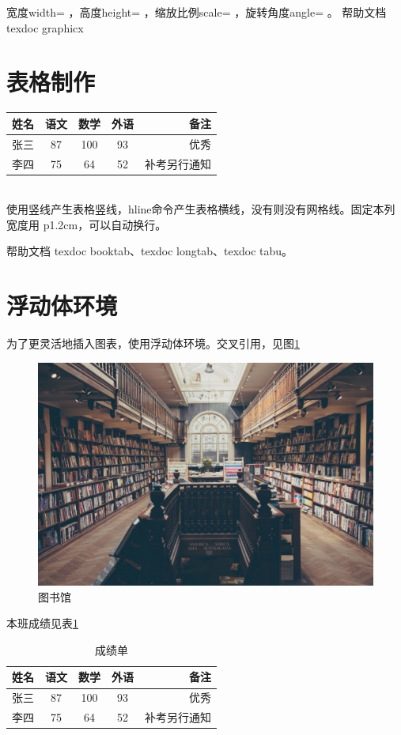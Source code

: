 \documentclass[UTF8]{article}  %
\begin{document}
宽度width= ，高度height= ，缩放比例scale= ，旋转角度angle= 。
帮助文档texdoc graphicx
\section{表格制作}
\begin{tabular}{|l||c|c|c|r|} %
	\hline \hline
	姓名 & 语文 & 数学 & 外语 & 备注 \\
	\hline \hline
	张三 & 87 & 100 & 93 & 优秀 \\
	\hline
	李四 & 75 & 64 & 52 & 补考另行通知 \\
	\hline \hline
\end{tabular}
\\

使用竖线产生表格竖线，hline命令产生表格横线，没有则没有网格线。固定本列宽度用 p{1.2cm}，可以自动换行。

帮助文档 texdoc booktab、texdoc longtab、texdoc tabu。
\section{浮动体环境}

为了更灵活地插入图表，使用浮动体环境。交叉引用，见图\ref{fig-library}

\begin{figure}[htbp] %
	\centering
	\includegraphics[scale=0.1]{library}
	\caption{图书馆}\label{fig-library}
\end{figure}

本班成绩见表\ref{tab-score}

\begin{table}[htbp]
	\centering
	\caption{成绩单}\label{tab-score}
	\begin{tabular}{|l||c|c|c|r|} %
		\hline \hline
		姓名 & 语文 & 数学 & 外语 & 备注 \\
		\hline \hline
		张三 & 87 & 100 & 93 & 优秀 \\
		\hline
		李四 & 75 & 64 & 52 & 补考另行通知 \\
		\hline \hline
	\end{tabular}
\end{table}
\end{document}
